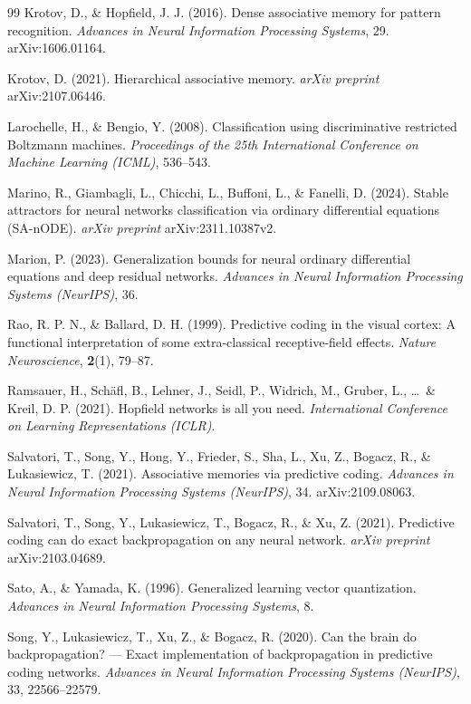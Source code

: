 \documentclass[11pt,a4paper]{article}
\begin{document}
\begin{thebibliography}{99}
Krotov, D., \& Hopfield, J. J. (2016).
Dense associative memory for pattern recognition.
\textit{Advances in Neural Information Processing Systems}, 29.
arXiv:1606.01164.

Krotov, D. (2021).
Hierarchical associative memory.
\textit{arXiv preprint} arXiv:2107.06446.

Larochelle, H., \& Bengio, Y. (2008).
Classification using discriminative restricted Boltzmann machines.
\textit{Proceedings of the 25th International Conference on Machine Learning (ICML)},
536--543.

Marino, R., Giambagli, L., Chicchi, L., Buffoni, L., \& Fanelli, D. (2024).
Stable attractors for neural networks classification via ordinary differential equations
(SA-nODE).
\textit{arXiv preprint} arXiv:2311.10387v2.

Marion, P. (2023).
Generalization bounds for neural ordinary differential equations and deep residual
networks.
\textit{Advances in Neural Information Processing Systems (NeurIPS)}, 36.

Rao, R. P. N., \& Ballard, D. H. (1999).
Predictive coding in the visual cortex: A functional interpretation of some
extra-classical receptive-field effects.
\textit{Nature Neuroscience}, \textbf{2}(1), 79--87.

Ramsauer, H., Sch\"{a}fl, B., Lehner, J., Seidl, P., Widrich, M., Gruber, L.,
\ldots\ \& Kreil, D. P. (2021).
Hopfield networks is all you need.
\textit{International Conference on Learning Representations (ICLR)}.

Salvatori, T., Song, Y., Hong, Y., Frieder, S., Sha, L., Xu, Z., Bogacz, R.,
\& Lukasiewicz, T. (2021).
Associative memories via predictive coding.
\textit{Advances in Neural Information Processing Systems (NeurIPS)}, 34.
arXiv:2109.08063.

Salvatori, T., Song, Y., Lukasiewicz, T., Bogacz, R., \& Xu, Z. (2021).
Predictive coding can do exact backpropagation on any neural network.
\textit{arXiv preprint} arXiv:2103.04689.

Sato, A., \& Yamada, K. (1996).
Generalized learning vector quantization.
\textit{Advances in Neural Information Processing Systems}, 8.

Song, Y., Lukasiewicz, T., Xu, Z., \& Bogacz, R. (2020).
Can the brain do backpropagation? --- Exact implementation of backpropagation in
predictive coding networks.
\textit{Advances in Neural Information Processing Systems (NeurIPS)}, 33, 22566--22579.


\end{thebibliography}
\end{document}
